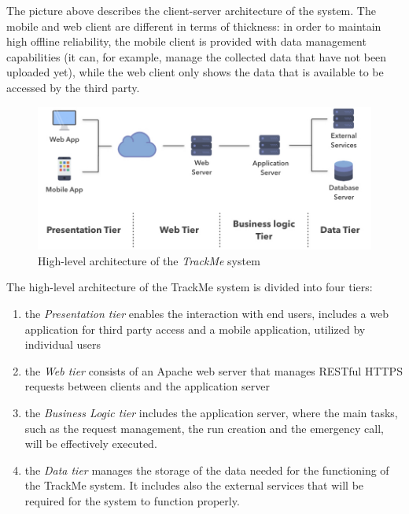 \newpage

The picture above describes the client-server architecture of the system. The mobile and web client are different in terms of thickness: in order to maintain high offline reliability, the mobile client is provided with data management capabilities (it can, for example, manage the collected data that have not been uploaded yet), while the web client only shows the data that is available to be accessed by the third party. 


\vspace{5mm}

\begin{figure}[H]
\includegraphics[scale=0.43,keepaspectratio]{./Pictures/high-level-basic.jpeg}
\centering
\caption{High-level architecture of the \textit{TrackMe} system}
\end{figure}

\vspace{5mm}

The high-level architecture of the TrackMe system is divided into four tiers:
\begin{enumerate}
\item the \textit{Presentation tier} enables the interaction with end users, includes a web application for third party access and a mobile application, utilized by individual users
\item the \textit{Web tier} consists of an Apache web server that manages RESTful HTTPS requests between clients and the application server
\item the \textit{Business Logic tier} includes the application server, where the main tasks, such as the request management, the run creation and the emergency call, will be effectively executed. 
\item the \textit{Data tier} manages the storage of the data needed for the functioning of the TrackMe system. It includes also the external services that will be required for the system to function properly.
\end{enumerate}

\newpage

